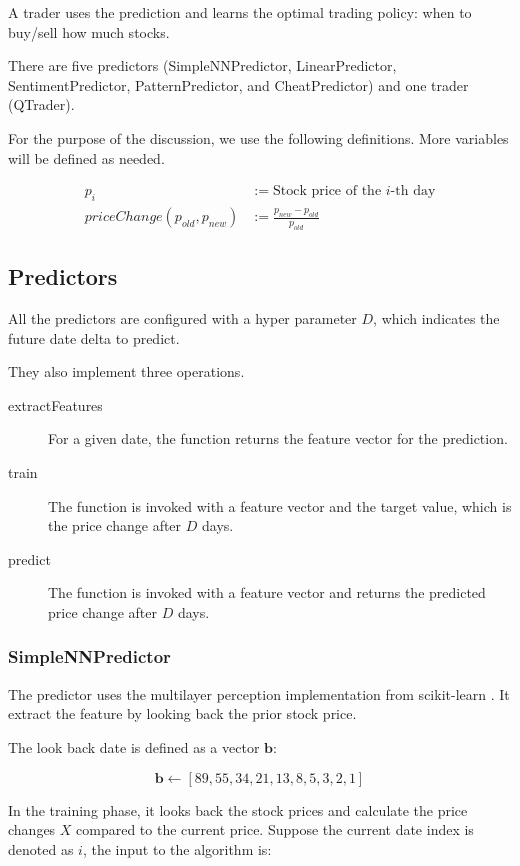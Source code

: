\documentclass[twocolumn,10pt]{asme2ej}
\newcommand{\vect}[1]{\boldsymbol{#1}}
\begin{document}
A trader uses the prediction and learns the optimal trading policy:
when to buy/sell how much stocks.

There are five predictors (SimpleNNPredictor, LinearPredictor,
SentimentPredictor, PatternPredictor, and CheatPredictor) and one
trader (QTrader). 

For the purpose of the discussion, we use the following definitions. More
variables will be defined as needed.

\begin{align*}
p_i &:= \text{Stock price of the }i\text{-th day} \\
priceChange(p_{old}, p_{new}) &:= \frac{p_{new} - p_{old}}{p_{old}}
\end{align*}

\subsection{Predictors}

All the predictors are configured with a hyper parameter $D$, which indicates
the future date delta to predict. 

They also implement three operations.

\begin{description}
  \item[extractFeatures] For a given date, the function returns the feature
    vector for the prediction.
  \item[train] The function is invoked with a feature vector and the target
    value, which is the price change after $D$ days.
  \item[predict] The function is invoked with a feature vector and returns the
    predicted price change after $D$ days.
\end{description}

\subsubsection{SimpleNNPredictor}
The predictor uses the multilayer perception implementation from
scikit-learn \cite{web:scikit_learn}. It extract the feature by
looking back the prior stock price.

The look back date is defined as a vector $\vect{b}$:

\[
\vect{b} \gets [89, 55, 34, 21, 13, 8, 5, 3, 2, 1]
\]

In the training phase, it looks back the stock prices and calculate
the price changes $X$ compared to the current price. Suppose the
current date index is denoted as $i$, the input to the algorithm is:
\end{document}
